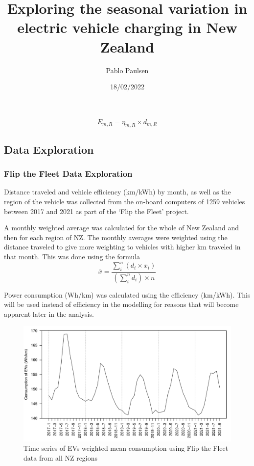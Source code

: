 \documentclass[
]{article}
\title{Exploring the seasonal variation in electric vehicle charging in
New Zealand}
\author{Pablo Paulsen}
\date{18/02/2022}
\begin{document}
\maketitle

\[ E_{m,R} = \eta_{m,R} \times d_{m,R}\]

\hypertarget{data-exploration}{%
\subsection{Data Exploration}\label{data-exploration}}

\hypertarget{flip-the-fleet-data-exploration}{%
\subsubsection{Flip the Fleet Data
Exploration}\label{flip-the-fleet-data-exploration}}

Distance traveled and vehicle efficiency (km/kWh) by month, as well as
the region of the vehicle was collected from the on-board computers of
1259 vehicles between 2017 and 2021 as part of the `Flip the Fleet'
project.

A monthly weighted average was calculated for the whole of New Zealand
and then for each region of NZ. The monthly averages were weighted using
the distance traveled to give more weighting to vehicles with higher km
traveled in that month. This was done using the formula
\[\bar{x} = \frac{\sum_{i}^{n} (d_i\times x_i)}{\left(\sum_{i}^{n} d_i\right)\times n}\]

Power consumption (Wh/km) was calculated using the efficiency (km/kWh).
This will be used instead of efficiency in the modelling for reasons
that will become apparent later in the analysis.

\begin{figure}
\centering
\includegraphics{final_report_files/figure-latex/consum_plot-1.pdf}
\caption{Time series of EVs weighted mean consumption using Flip the
Fleet data from all NZ regions\label{fig:consum_plot}}
\end{figure}
\end{document}

